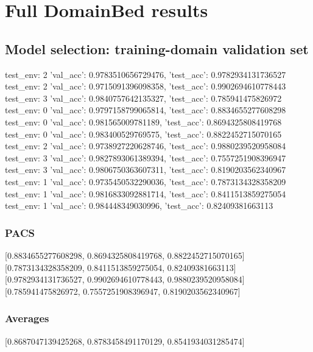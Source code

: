 \documentclass{article}
\begin{document}
\section{Full DomainBed results}

\subsection{Model selection: training-domain validation set}
test_env: 2
{'val_acc': 0.9783510656729476, 'test_acc': 0.9782934131736527}
test_env: 2
{'val_acc': 0.9715091396098358, 'test_acc': 0.9902694610778443}
test_env: 3
{'val_acc': 0.9840757642135327, 'test_acc': 0.785941475826972}
test_env: 0
{'val_acc': 0.9797158799065814, 'test_acc': 0.8834655277608298}
test_env: 0
{'val_acc': 0.981565009781189, 'test_acc': 0.8694325808419768}
test_env: 0
{'val_acc': 0.983400529769575, 'test_acc': 0.8822452715070165}
test_env: 2
{'val_acc': 0.9738927220628746, 'test_acc': 0.9880239520958084}
test_env: 3
{'val_acc': 0.9827893061389394, 'test_acc': 0.7557251908396947}
test_env: 3
{'val_acc': 0.9806750363607311, 'test_acc': 0.8190203562340967}
test_env: 1
{'val_acc': 0.9735450532290036, 'test_acc': 0.7873134328358209}
test_env: 1
{'val_acc': 0.9816833092881714, 'test_acc': 0.8411513859275054}
test_env: 1
{'val_acc': 0.984448349030996, 'test_acc': 0.82409381663113}

\subsubsection{PACS}
[0.8834655277608298, 0.8694325808419768, 0.8822452715070165]
[0.7873134328358209, 0.8411513859275054, 0.82409381663113]
[0.9782934131736527, 0.9902694610778443, 0.9880239520958084]
[0.785941475826972, 0.7557251908396947, 0.8190203562340967]

\begin{center}
\end{center}

\subsubsection{Averages}
[0.8687047139425268, 0.8783458491170129, 0.8541934031285474]

\begin{center}
\end{center}
\end{document}
